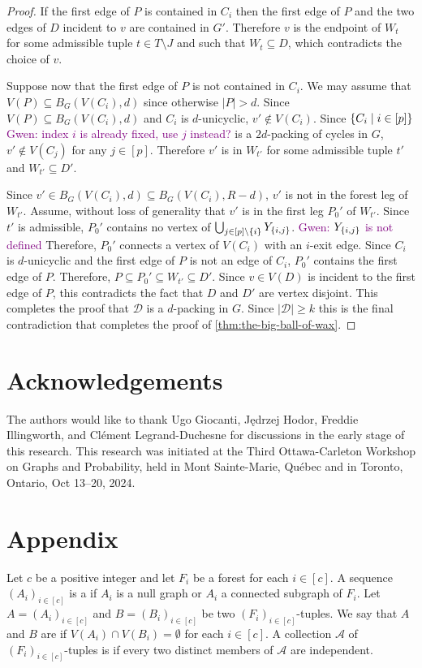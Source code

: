 \documentclass{patmorin}
\newcommand{\gwen}[1]{\textcolor{Purple}{Gwen: #1}}
\DeclarePairedDelimiter\set{\{}{\}}
\begin{document}
\begin{proof}
If the first edge of $P$ is contained in $C_i$ then the first edge of $P$ and the two edges of $D$ incident to $v$ are contained in $G'$.  Therefore $v$ is the endpoint of $W_t$ for some admissible tuple $t\in T\setminus J$ and such that $W_t\subseteq D$, which contradicts the choice of $v$.


Suppose now that the first edge of $P$ is not contained in $C_i$.  We may assume that $V(P)\subseteq B_G(V(C_i),d)$ since otherwise $|P|>d$.  Since $V(P)\subseteq B_G(V(C_i),d)$ and $C_i$ is $d$-unicyclic, $v'\not\in V(C_i)$.  Since $\set{C_i\mid i\in[p]}$ 
\gwen{index $i$ is already fixed, use $j$ instead?}
is a $2d$-packing of cycles in $G$, $v'\not\in V(C_j)$ for any $j\in[p]$. Therefore $v'$ is in $W_{t'}$ for some admissible tuple $t'$ and $W_{t'}\subseteq D'$.  

Since $v'\in B_G(V(C_i),d)\subseteq B_G(V(C_i),R-d)$, $v'$ is not in the forest leg of $W_{t'}$.  
Assume, without loss of generality that $v'$ is in the first leg $P_0'$ of $W_{t'}$.  
Since $t'$ is admissible, $P_0'$ contains no vertex of $\bigcup_{j\in[p]\setminus \set{i}} Y_{\set{i,j}}$. 
\gwen{$Y_{\set{i,j}}$ is not defined} 
Therefore, $P_0'$ connects a vertex of $V(C_i)$ with an $i$-exit edge.
Since $C_i$ is $d$-unicyclic and the first edge of $P$ is not an edge of $C_i$, $P_0'$ contains the first edge of $P$. Therefore, $P\subseteq P_0'\subseteq W_{t'}\subseteq D'$.  Since $v\in V(D)$ is incident to the first edge of $P$, this contradicts the fact that $D$ and $D'$ are vertex disjoint.
This completes the proof that $\mathcal{D}$ is a $d$-packing in $G$. Since $|\mathcal{D}|\geq k$ this is the final contradiction that completes the proof of \cref{thm:the-big-ball-of-wax}.
\end{proof}

\section*{Acknowledgements}
The authors would like to thank 
Ugo Giocanti,
Jędrzej Hodor, 
Freddie Illingworth, and 
Clément Legrand-Duchesne 
for discussions in the early stage of this research.
This research was initiated at the Third Ottawa-Carleton Workshop on Graphs and Probability, held in Mont Sainte-Marie, Québec and in Toronto, Ontario, Oct 13–20, 2024.





\section*{Appendix}
Let $c$ be a positive integer and 
let $F_i$ be a forest for each $i\in[c]$. 
A sequence $(A_i)_{i\in[c]}$ is a  if 
$A_i$ is a null graph or $A_i$ a connected subgraph of $F_i$. 
Let $A=(A_i)_{i\in[c]}$ and $B=(B_i)_{i\in[c]}$ be two $(F_i)_{i\in[c]}$-tuples. 
We say that $A$ and $B$ are  if 
$V(A_i)\cap V(B_i)=\emptyset$ for each $i\in[c]$.
A collection $\mathcal{A}$ of $(F_i)_{i\in[c]}$-tuples is  if every two distinct members of $\mathcal{A}$ are independent.
\end{document}
